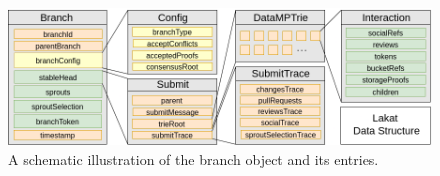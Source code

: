 \begin{figure}[t!]
\begin{center}
\includegraphics[width=\textwidth]{src/img/BranchV9.png}
\end{center}
 \caption{A schematic illustration of the branch object and its entries.}
 \label{fig:branchstructure}
\end{figure}

